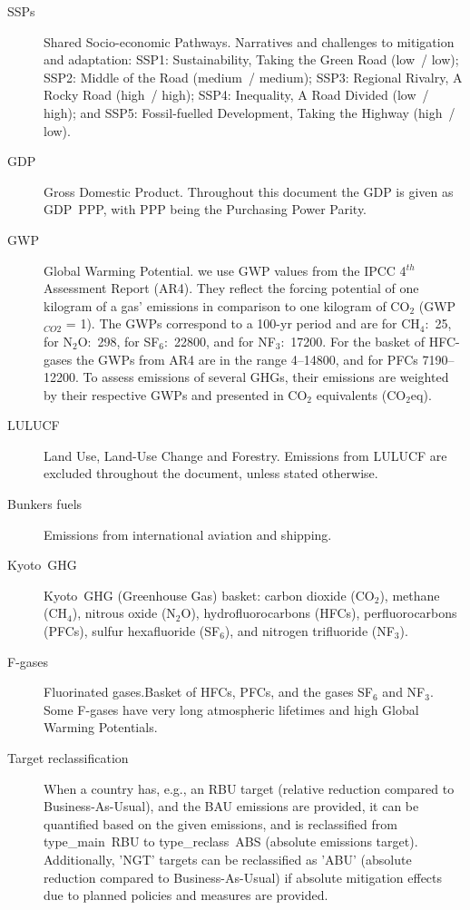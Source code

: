 \documentclass[12pt]{article}
\begin{document}
 \begin{description}
 \item [SSPs] Shared Socio-economic Pathways.
 Narratives and challenges to mitigation and adaptation: 
 SSP1: Sustainability, Taking the Green Road (low~/ low);
 SSP2: Middle of the Road (medium~/ medium);
 SSP3: Regional Rivalry, A Rocky Road (high~/ high);
 SSP4: Inequality, A Road Divided (low~/ high); and
 SSP5: Fossil-fuelled Development, Taking the Highway (high~/ low).
 \item [GDP] Gross Domestic Product. 
 Throughout this document the GDP is given as GDP~PPP, with PPP being the Purchasing Power Parity.
 \item [GWP] Global Warming Potential. we use GWP values from the IPCC 4$^{th}$ Assessment Report (AR4). 
 They reflect the forcing potential of one kilogram of a gas' emissions in comparison to one kilogram of CO$_2$ (GWP$_{CO2}$ = 1). 
 The GWPs correspond to a 100-yr period and are for CH$_4$:~25, for N$_2$O:~298, for SF$_6$:~22800, and for NF$_3$:~17200. 
 For the basket of HFC-gases the GWPs from AR4 are in the range 4--14800, and for PFCs 7190--12200. 
 To assess emissions of several GHGs, their emissions are weighted by their respective GWPs and presented in CO$_2$ equivalents (CO$_2$eq).
 \item [LULUCF] Land Use, Land-Use Change and Forestry. 
 Emissions from LULUCF are excluded throughout the document, unless stated otherwise.
 \item [Bunkers fuels] Emissions from international aviation and shipping.
 \item [Kyoto~GHG] Kyoto~GHG (Greenhouse Gas) basket: carbon dioxide (CO$_2$), methane (CH$_4$), nitrous oxide (N$_2$O), hydrofluorocarbons (HFCs), perfluorocarbons (PFCs), sulfur hexafluoride (SF$_6$), and nitrogen trifluoride (NF$_3$).
 \item [F-gases] Fluorinated gases.Basket of HFCs, PFCs, and the gases SF$_6$ and NF$_3$. 
 Some F-gases have very long atmospheric lifetimes and high Global Warming Potentials.
 \item [Target reclassification] When a country has, e.g., an RBU target (relative reduction compared to Business-As-Usual), and the BAU emissions are provided, it can be quantified based on the given emissions, and is reclassified from type\_main~RBU to type\_reclass~ABS (absolute emissions target).
 Additionally, 'NGT' targets can be reclassified as 'ABU' (absolute reduction compared to Business-As-Usual) if absolute mitigation effects due to planned policies and measures are provided.
 \end{description}
\end{document}
